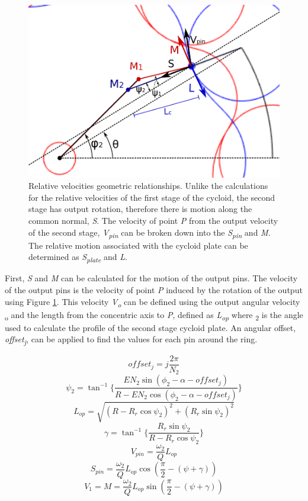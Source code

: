 \begin{figure}[!b]
	\centering
	\includegraphics[width=0.50\linewidth]{fig/two_stage_vel_angles}
   \caption{Relative velocities geometric relationships. Unlike the calculations for the relative velocities of the first stage of the cycloid, the second stage has output rotation, therefore there is motion along the common normal, \textit{S}. The velocity of point \textit{P} from the output velocity of the second stage, \textit{V\textsubscript{pin}} can be broken down into the \textit{S\textsubscript{pin}} and \textit{M}. The relative motion associated with the cycloid plate can be determined as \textit{S\textsubscript{plate}} and \textit{L}.}
   \label{fig:dual_relative_motion}
\end{figure}

First, \textit{S} and \textit{M} can be calculated for the motion of the output pins. The velocity of the output pins is the velocity of point \textit{P} induced by the rotation of the output using Figure \ref{fig:dual_relative_motion}. This velocity \textit{V\textsubscript{o}} can be defined using the output angular velocity \textomega\textsubscript{o} and the length from the concentric axis to \textit{P}, defined as \textit{L\textsubscript{op}} where \textpsi\textsubscript{2} is the angle used to calculate the profile of the second stage cycloid plate. An angular offset, \textit{offset\textsubscript{j}}, can be applied to find the values for each pin around the ring. 

\begin{equation}\label{eq:offset2}
offset_j = j \frac{2\pi}{N_2}
\end{equation}
\begin{equation}\label{eq:psi2}
\psi_2 = \tan^{-1}\bigg\{\frac{E N_2 \sin(\phi_2-\alpha-offset_j)}{R-E N_2\cos(\phi_2-\alpha-offset_j)}\bigg\}
\end{equation}
\begin{equation} \label{eq:l_op}
L_{op} = \sqrt{(R-R_r\cos\psi_2)^2 + (R_r\sin\psi_2)^2}
\end{equation}
\begin{equation}
\gamma = \tan^{-1}\bigg\{\frac{R_r\sin\psi_2}{R-R_r\cos\psi_2}\bigg\}
\end{equation}
\begin{equation}
V_{pin} = \frac{\omega_2}{Q} L_{op}
\end{equation}
\begin{equation} \label{eq:s_pin}
S_{pin} = \frac{\omega_2}{Q} L_{op} \cos(\frac{\pi}{2}-(\psi+\gamma))
\end{equation}
\begin{equation}
V_{1} = M = \frac{\omega_2}{Q} L_{op} \sin(\frac{\pi}{2}-(\psi+\gamma))
\end{equation}


